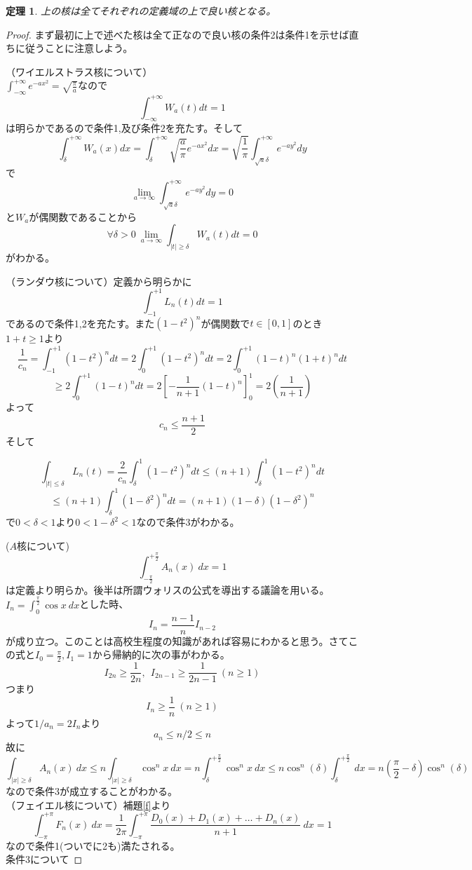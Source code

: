 \documentclass[leqno]{jsarticle}
\newtheorem{theorem}{定理}
\begin{document}
\begin{theorem}上の核は全てそれぞれの定義域の上で良い核となる。
\end{theorem}

\begin{proof}まず最初に上で述べた核は全て正なので良い核の条件2は条件1を示せば直ちに従うことに注意しよう。

（ワイエルストラス核について）\\ 
$\displaystyle \int_{-\infty}^{+\infty}e^{-ax^2}=\sqrt{\frac{\pi}{a}}$なので
\[
\int_{-\infty}^{+\infty}W_a(t)dt=1
\]
は明らかであるので条件1,及び条件2を充たす。そして
\[
\int_{\delta}^{+\infty}W_a(x)dx=\int_{\delta}^{+\infty}\sqrt{\frac{a}{\pi}}e^{-ax^2}dx=
\sqrt{\frac{1}{\pi}}\int_{\sqrt a\delta}^{+\infty}e^{-ay^2}dy
\]
で
\[
\lim_{a\rightarrow \infty}\int_{\sqrt a\delta}^{+\infty}e^{-ay^2}dy=0
\]
と$W_a$が偶関数であることから
\[
\forall \delta>0\ \lim_{a\rightarrow \infty}\int_{|t|\ge \delta}W_a(t)dt=0
\]
がわかる。

（ランダウ核について）定義から明らかに
\[
\int_{-1}^{+1}L_n(t)dt=1
\]であるので条件1,2を充たす。また$(1-t^2)^n$が偶関数で$t\in [0,1]$のとき$1+t\ge 1$より
\[
\frac{1}{c_n}=\int_{-1}^{+1}(1-t^2)^ndt=
2\int_{0}^{+1}(1-t^2)^ndt =2\int_{0}^{+1}(1-t)^n(1+t)^ndt 
\]
\[
\ge 2\int_{0}^{+1}(1-t)^ndt=
2\left[ -\frac{1}{n+1}(1-t)^n\right]_{0}^{1}=2(\frac{1}{n+1})
\]
よって
\[
c_n\le \frac{n+1}{2}
\]そして

\[
\int_{|t|\le \delta}L_n(t)=\frac{2}{c_n}\int_{\delta}^{1}(1-t^2)^ndt\le 
(n+1)\int_{\delta}^1(1-t^2)^ndt
\]
\[
\le (n+1)\int_{\delta}^1(1-\delta^2)^ndt=(n+1)(1-\delta)(1-\delta^2)^n
\]
で$0<\delta<1$より$0<1-\delta^2<1$なので条件3がわかる。

($A$核について)
\[
\int_{-\frac{\pi}{2}}^{+\frac{\pi}{2}}A_n(x)\ dx=1
\]
は定義より明らか。後半は所謂ウォリスの公式を導出する議論を用いる。
$\displaystyle I_n=\int_{0}^{\frac{\pi}{2}}\cos x\ dx$とした時、
\[
I_n=\frac{n-1}{n}I_{n-2}
\]
が成り立つ。このことは高校生程度の知識があれば容易にわかると思う。さてこの式と$I_0=\frac{\pi}{2},I_1=1$から帰納的に次の事がわかる。
\[
I_{2n}\ge\frac{1}{2n},\ \ I_{2n-1}\ge \frac{1}{2n-1} \ (n\ge 1)
\]つまり
\[
I_n\ge \frac{1}{n}\ (n\ge 1)
\]
よって$1/a_n=2I_n$より
\[
a_n\le n/2\le n
\]故に
\[
\int_{|x|\ge \delta}A_n(x)\ dx\le n\int_{|x|\ge \delta}\cos^{n}x\ dx=n\int_{\delta}^{+\frac{\pi}{2}}\cos^nx \ dx\le n\cos^n(\delta) \int_{\delta}^{+\frac{\pi}{2}}\ dx=n(\frac{\pi}{2}-\delta)\cos^n(\delta)
\]
なので条件3が成立することがわかる。\\ 
（フェイエル核について）補題\ref{f}より
\[
\int_{-\pi}^{+\pi}F_n(x)\ dx=\frac{1}{2\pi}\int_{-\pi}^{+\pi} \frac{D_0(x)+D_1(x)+\dots +D_n(x)}{n+1}\ dx=1
\]なので条件1(ついでに2も)満たされる。\\ 
条件3について


\end{proof}
\end{document}
